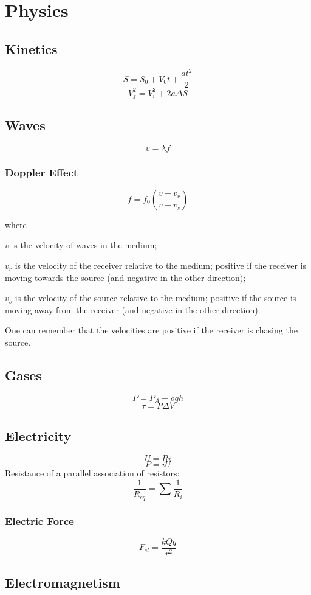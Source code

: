 \documentclass{book}
\newcommand*\reciprocal[1]{\frac{1}{#1}}
\begin{document}
\chapter{Physics}

\section{Kinetics}
\[S = S_0 + V_0 t + \frac{a t^2}{2}\]
\[V_f^2 = V_i^2 + 2 a \Delta S\]

\section{Waves}
\[v = \lambda f\]

\subsection{Doppler Effect}
\[f = f_0 \left ( \frac{v + v_r}{v + v_s} \right )\]

where

\(v\) is the velocity of waves in the medium;

\(v_r\) is the velocity of the receiver relative to the medium; positive if the
receiver is moving towards the source (and negative in the other direction);

\(v_s\) is the velocity of the source relative to the medium; positive if the
source is moving away from the receiver (and negative in the other direction).

One can remember that the velocities are positive if the receiver is chasing
the source.

\section{Gases}
\[P = P_A + \rho g h\]
\[\tau = P \Delta V\]

\section{Electricity}
\[U = R i\]
\[P = i U\]
Resistance of a parallel association of resistors:
\[\reciprocal{R_{eq}} = \sum{\reciprocal{R_i}}\]

\subsection{Electric Force}
\[F_{el} = \frac{k Q q}{r^2}\]
\section{Electromagnetism}
\end{document}

